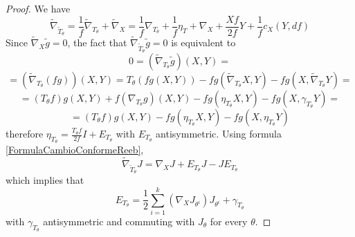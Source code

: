 \documentclass{article}
\theoremstyle{definition}
\theoremstyle{remark}
\begin{document}
\begin{proof}
 We have
 \begin{equation}\label{FormulaCambioConformeReeb}
  \widetilde{\nabla}_{\widetilde{T}_{\theta}} = \frac{1}{f}\widetilde{\nabla}_{T_{\theta}} + \widetilde{\nabla}_{X} = \frac{1}{f}\nabla_{T_{\theta}} + \frac{1}{f}\eta_T + \nabla_X + \frac{Xf}{2f}Y + \frac{1}{f}c_X(Y,df)
 \end{equation}
 Since $\widetilde{\nabla}_{X}\widetilde{g}=0$, the fact that $\widetilde{\nabla}_{\widetilde{T}_{\theta}}\widetilde{g}=0$ is equivalent to
 $$0= (\widetilde{\nabla}_{T_{\theta}}\widetilde{g})(X,Y) =$$
 $$= (\widetilde{\nabla}_{T_{\theta}}(fg))(X,Y) = T_{\theta}(fg(X,Y)) - fg(\widetilde{\nabla}_{T_{\theta}}X,Y) - fg(X,\widetilde{\nabla}_{T_{\theta}}Y) = $$
 $$ =   (T_{\theta}f)g(X,Y)  + f(\nabla_{T_{\theta}}g)(X,Y) - fg(\eta_{T_{\theta}}X,Y) - fg(X,\gamma_{T_{\theta}}Y) = $$
 $$ =   (T_{\theta}f)g(X,Y) - fg(\eta_{T_{\theta}}X,Y) - fg(X,\eta_{T_{\theta}}Y) $$
 therefore $\eta_{T_{\theta}} = \frac{T_{\theta}f}{2f}I + E_{T_{\theta}}$ with $E_{T_{\theta}}$ antisymmetric.
 Using formula \eqref{FormulaCambioConformeReeb},
 $$\widetilde{\nabla}_{\widetilde{T}_{\theta}}J = \nabla_XJ + E_{T_{\theta}}J - JE_{T_{\theta}}$$
 which implies that
 $$E_{T_{\theta}} = \frac{1}{2}\sum_{i=1}^k(\nabla_XJ_{\theta^i})J_{\theta^i}+\gamma_{T_{\theta}}$$
 with $\gamma_{T_{\theta}}$ antisymmetric and commuting with $J_{\theta}$ for every $\theta$.
 

\end{proof}
\end{document}
